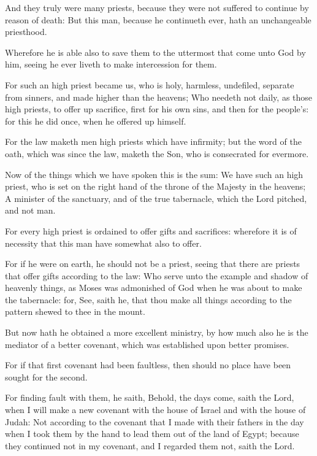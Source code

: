 \Verse And they truly were many priests, because they were not suffered to continue by reason of death: \Verse But this man, because he continueth ever, hath an unchangeable priesthood.

\Verse Wherefore he is able also to save them to the uttermost that come unto God by him, seeing he ever liveth to make intercession for them.

\Verse For such an high priest became us, who is holy, harmless, undefiled, separate from sinners, and made higher than the heavens; \Verse Who needeth not daily, as those high priests, to offer up sacrifice, first for his own sins, and then for the people's: for this he did once, when he offered up himself.

\Verse For the law maketh men high priests which have infirmity; but the word of the oath, which was since the law, maketh the Son, who is consecrated for evermore.


\Chapter
\Verse Now of the things which we have spoken this is the sum: We have such an high priest, who is set on the right hand of the throne of the Majesty in the heavens; \Verse A minister of the sanctuary, and of the true tabernacle, which the Lord pitched, and not man.

\Verse For every high priest is ordained to offer gifts and sacrifices: wherefore it is of necessity that this man have somewhat also to offer.

\Verse For if he were on earth, he should not be a priest, seeing that there are priests that offer gifts according to the law: \Verse Who serve unto the example and shadow of heavenly things, as Moses was admonished of God when he was about to make the tabernacle: for, See, saith he, that thou make all things according to the pattern shewed to thee in the mount.

\Verse But now hath he obtained a more excellent ministry, by how much also he is the mediator of a better covenant, which was established upon better promises.

\Verse For if that first covenant had been faultless, then should no place have been sought for the second.

\Verse For finding fault with them, he saith, Behold, the days come, saith the Lord, when I will make a new covenant with the house of Israel and with the house of Judah: \Verse Not according to the covenant that I made with their fathers in the day when I took them by the hand to lead them out of the land of Egypt; because they continued not in my covenant, and I regarded them not, saith the Lord.


